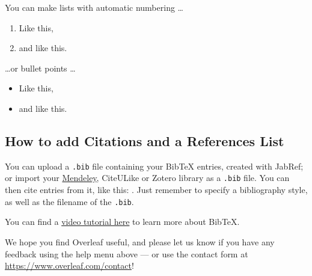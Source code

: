 \documentclass[a4paper]{article}
\begin{document}
You can make lists with automatic numbering \dots

\begin{enumerate}
	\item Like this,
	\item and like this.
\end{enumerate}
\dots or bullet points \dots
\begin{itemize}
	\item Like this,
	\item and like this.
\end{itemize}

\subsection{How to add Citations and a References List}

You can upload a \verb|.bib| file containing your BibTeX entries, created with JabRef; or import your \href{https://www.overleaf.com/blog/184}{Mendeley}, CiteULike or Zotero library as a \verb|.bib| file. You can then cite entries from it, like this: \cite{greenwade93}. Just remember to specify a bibliography style, as well as the filename of the \verb|.bib|.

You can find a \href{https://www.overleaf.com/help/97-how-to-include-a-bibliography-using-bibtex}{video tutorial here} to learn more about BibTeX.

We hope you find Overleaf useful, and please let us know if you have any feedback using the help menu above --- or use the contact form at \url{https://www.overleaf.com/contact}!



\end{document}
